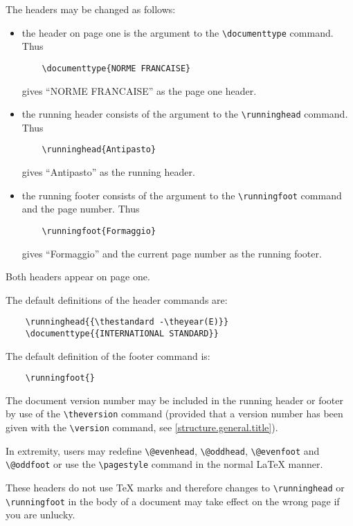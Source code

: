 The headers may be changed as follows:
\begin{itemize}
\item the header on page one is the argument to the
    \verb|\documenttype| command.
    Thus
    \begin{verbatim}
    \documenttype{NORME FRANCAISE}
    \end{verbatim}
    gives ``NORME FRANCAISE'' as the page one header.
\item the running header consists of the argument to the
    \verb|\runninghead| command.
    Thus
    \begin{verbatim}
    \runninghead{Antipasto}
    \end{verbatim}
    gives ``Antipasto'' as the running header.
\item the running footer consists of the argument to the
    \verb|\runningfoot| command and the page number.
    Thus
    \begin{verbatim}
    \runningfoot{Formaggio}
    \end{verbatim}
    gives ``Formaggio'' and the current page number as the running footer.
\end{itemize}

\begin{notes}
\item Both headers appear on page one.
\item The default definitions of the header commands are:
    \begin{verbatim}
    \runninghead{{\thestandard -\theyear(E)}}
    \documenttype{{INTERNATIONAL STANDARD}}
    \end{verbatim}
\item The default definition of the footer command is:
    \begin{verbatim}
    \runningfoot{}
    \end{verbatim}
\item The document version number may be included in the running header
    or footer by use of the \verb|\theversion| command (provided that a
    version number has been given with the \verb|\version| command, see
    \ref{structure.general.title}).
\item In extremity, users may redefine
    \verb|\@evenhead|, \verb|\@oddhead|, \verb|\@evenfoot| and
    \verb|\@oddfoot| or use the \verb|\pagestyle|
    command in the normal LaTeX manner.
\item These headers do not use TeX marks and therefore changes to
    \verb|\runninghead| or \verb|\runningfoot| in the body of a
    document may take effect on the wrong page if you are unlucky.
\end{notes}

